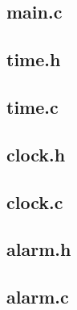 \documentclass[11pt,a4paper]{scrartcl}
\begin{document}
\subsection{main.c}


\subsection{time.h}


\subsection{time.c}


\subsection{clock.h}


\subsection{clock.c}


\subsection{alarm.h}


\subsection{alarm.c}

\end{document}
